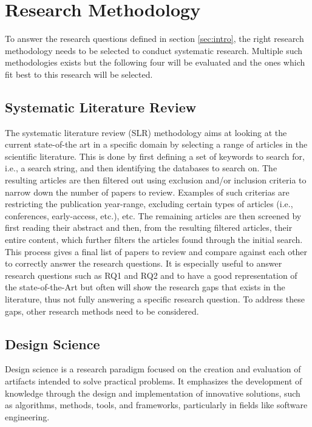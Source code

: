 
\section{Research Methodology}
\label{sec:methodology}

To answer the research questions defined in section \ref{sec:intro},
the right research methodology needs to be selected to conduct 
systematic research.
Multiple such methodologies exists but the following four will be evaluated
and the ones which fit best to this research will be selected.

\subsection{Systematic Literature Review}

The systematic literature review (SLR) methodology aims at
looking at the current state-of-the art in a specific domain by selecting a range 
of articles in the scientific literature\cite{KITCHENHAM2009SLR}.
This is done by first defining a set of keywords to search for, i.e., a search string, 
and then identifying the databases to search on.
The resulting articles are then filtered out using exclusion and/or inclusion criteria
to narrow down the number of papers to review.
Examples of such criterias are restricting the publication year-range,
excluding certain types of articles (i.e., conferences, early-access, etc.), etc.
The remaining articles are then screened by first reading 
their abstract and then, from the resulting filtered articles, their entire content,
which further filters the articles found through the initial search.
This process gives a final list of papers to review and compare against each other 
to correctly answer the research questions. 
It is especially useful to answer research questions such as RQ1 and RQ2
and to have a good representation of the state-of-the-Art
but often will show the research gaps that exists in the literature,
thus not fully answering a specific research question.
To address these gaps, other research methods need to be considered.

\subsection{Design Science}

Design science is a research paradigm focused on the creation and evaluation 
of artifacts intended to solve practical problems. It emphasizes 
the development of knowledge through the design and implementation 
of innovative solutions, such as algorithms, methods, tools, 
and frameworks, particularly in fields like software engineering\cite{Wieringa2010DesignScienceMethod}.

